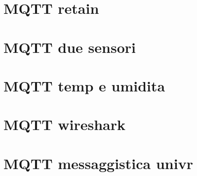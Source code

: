 \documentclass[11pt]{article}
\begin{document}
\section{MQTT retain}

\newpage

\section{MQTT due sensori}

\newpage

\section{MQTT temp e umidita}

\newpage

\section{MQTT wireshark}

\newpage

\section{MQTT messaggistica univr}

\newpage
\end{document}
